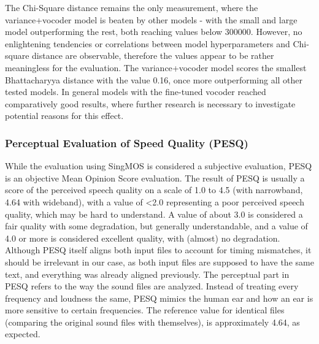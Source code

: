 \documentclass[a4paper]{article}
\begin{document}
	The Chi-Square distance remains the only measurement, where the variance+vocoder model is beaten by other models - with the small and large model outperforming the rest, both reaching values below 300000. However, no enlightening tendencies or correlations between model hyperparameters and Chi-square distance are observable, therefore the values appear to be rather meaningless for the evaluation.
	The variance+vocoder model scores the smallest Bhattacharyya distance with the value 0.16, once more outperforming all other tested models. In general models with the fine-tuned vocoder reached comparatively good results, where further research is necessary to investigate potential reasons for this effect.
	
	\subsubsection{Perceptual Evaluation of Speed Quality (PESQ)}
	While the evaluation using SingMOS is considered a subjective evaluation, PESQ
	is an objective Mean Opinion Score evaluation. The result of PESQ is usually a
	score of the perceived speech quality on a scale of 1.0 to 4.5 (with narrowband,
	4.64 with wideband), with a value of <2.0 representing a poor perceived speech
	quality, which may be hard to understand. A value of about 3.0 is considered a
	fair quality with some degradation, but generally understandable, and a value of
	4.0 or more is considered excellent quality, with (almost) no degradation.
	Although PESQ itself aligns both input files to account for timing mismatches,
	it should be irrelevant in our case, as both input files are supposed to have
	the same text, and everything was already aligned previously. The perceptual
	part in PESQ refers to the way the sound files are analyzed. Instead of treating
	every frequency and loudness the same, PESQ mimics the human ear and how an ear
	is more sensitive to certain frequencies. The reference value for identical
	files (comparing the original sound files with themselves), is approximately 4.64, as
	expected.
	
\end{document}
